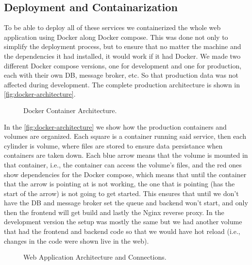 \subsection{Deployment and Containarization}



To be able to deploy all of these services we containerized the whole web application using Docker \autocite{merkelDockerLightweightLinux2014} along Docker compose.
This was done not only to simplify the deployment process,
but to ensure that no matter the machine and the dependencies it had installed,
it would work if it had Docker.
We made two different Docker compose versions, one for development and one for production,
each with their own \ac{DB}, message broker, etc. So that production data was not affected during development.
The complete production architecture is shown in \autoref{fig:docker-architecture}.

\begin{figure}[!htbp]
    \centering
    
    \caption{Docker Container Architecture.}
    \label{fig:docker-architecture}
\end{figure}

In the \autoref{fig:docker-architecture} we show how the production containers and volumes are organized.
Each square is a container running said service,
then each cylinder is volume, where files are stored to ensure data persistance when containers are taken down.
Each blue arrow means that the volume is mounted in that container, i.e., the container can access the volume's files,
and the red ones show dependencies for the Docker compose,
which means that until the container that the arrow is pointing at is not working,
the one that is pointing (has the start of the arrow) is not going to get started.
This ensures that until we don't have the \ac{DB} and message broker set
the queue and backend won't start,
and only then the frontend will get build
and lastly the Nginx reverse proxy.
In the development version the setup was mostly the same
but we had another volume that had the frontend and backend code
so that we would have hot reload (i.e., changes in the code were shown live in the web).



\begin{figure}[!htbp]
    \centering
     
    \caption{Web Application Architecture and Connections.}
    \label{fig:app-architecture}
\end{figure}


